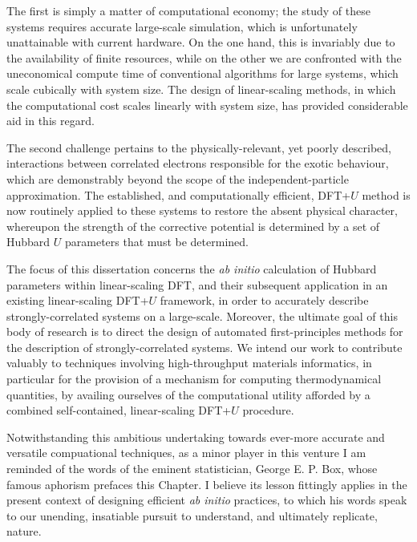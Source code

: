 The first is simply a matter of 
computational economy; 
the study of these systems 
requires accurate large-scale simulation, 
which is unfortunately unattainable with current hardware.
%
On the one hand, 
this is invariably due to the availability of finite resources, 
while on the other we are confronted with the uneconomical 
compute time of conventional algorithms for large systems, 
which scale cubically with system size.
%
The design of linear-scaling methods, 
in which the computational cost 
scales linearly with system size, 
has provided considerable aid in this regard.

The second challenge pertains to the physically-relevant, 
yet poorly described, interactions between correlated electrons 
responsible for the exotic behaviour, 
which are demonstrably beyond the scope 
of the independent-particle approximation.
%
The established, and computationally efficient, 
DFT+$U$ method is now routinely applied to these systems 
to restore the absent physical character, 
whereupon the strength of the corrective potential 
is determined by a set of Hubbard $U$ parameters 
that must be determined.
%


The focus of this dissertation concerns
the {\it ab initio} calculation of 
Hubbard parameters within linear-scaling DFT, 
and their subsequent application in an 
existing linear-scaling DFT+$U$ framework, 
in order to accurately describe strongly-correlated systems on a large-scale.
%
Moreover, 
the ultimate goal of this body of research  
is to direct the design of automated first-principles methods 
for the description of strongly-correlated systems.
% 
We intend our work to contribute valuably to  
techniques involving high-throughput materials informatics, 
in particular for the provision of a mechanism for 
computing thermodynamical quantities, 
by availing ourselves of the computational utility afforded by 
a combined self-contained, linear-scaling DFT+$U$ procedure.


Notwithstanding 
this ambitious undertaking 
towards ever-more accurate 
and versatile compuational techniques, 
as a minor player in this venture 
I am reminded of the words of 
the eminent statistician, George E. P. Box, 
whose famous aphorism 
prefaces this Chapter.
%
I believe its lesson fittingly applies 
in the present context of 
designing efficient {\it ab initio} practices, 
to which his words speak to our 
unending, insatiable pursuit to understand,
and ultimately replicate, nature.


